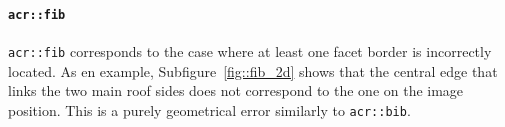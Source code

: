             \paragraph{\texttt{\acrlong*{acr::fib}}}
                \texttt{\gls{acr::fib}} corresponds to the case where at least one facet border is incorrectly located.
                As en example, Subfigure~\ref{fig::fib_2d} shows that the central edge that links the two main roof sides does not correspond to the one on the image position.
                This is a purely geometrical error similarly to \texttt{\gls{acr::bib}}.\\

                \begin{figure}[htbp]
                    \centering
\end{figure}
